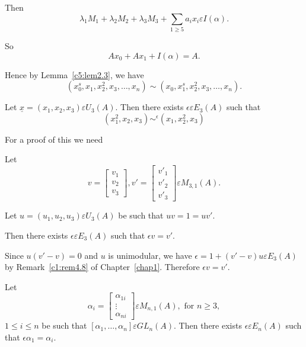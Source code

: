 \begin{Proof}
Then
$$
\lambda_1 M_1+\lambda_2 M_2+\lambda_3 M_3+\sum\limits_{1\geq 5}
a_ix_i\varepsilon I(\alpha).
$$

So
$$
Ax_0+Ax_1+I(\alpha)=A.
$$

Hence by Lemma~\ref{c5:lem2.3}, we have
$$
\left(x^{s}_0,x_1,x^{2}_2,x_3,\ldots,x_n\right)\sim\left(x_0,x^{s}_1,x^{2}_2,x_3,\ldots,x_n\right).
$$
\enprf
\end{Proof}

\begin{lem}\label{c5:lem2.6}
Let $\underline{x}=(x_1,x_2,x_3)\varepsilon U_3(A)$. Then there exists
$\epsilon \varepsilon E_3(A)$ such that 
$$
\left(x^{2}_1,x_2,x_3\right)\displaystyle\mathop{\sim}^{\epsilon}\left(x_1,x^{2}_2,x_3\right)
$$
\end{lem}

For a proof of this we need

\begin{lem}\label{c5:lem2.7}
Let 
$$
v=
\begin{bmatrix}
v_1\\
v_2\\
v_3
\end{bmatrix}, v'=\begin{bmatrix}
v'_1\\
v'_2\\
v'_3
\end{bmatrix} \varepsilon M_{3,1}(A).
$$

Let $u=(u_1,u_2,u_3)\varepsilon U_3(A)$ be such that $uv=1=uv'$. 

Then there exists $\epsilon \varepsilon E_3(A)$ such that $\epsilon
v=v'$. 
\end{lem}

\begin{Proof}
Since $u(v'-v)=0$ and $u$ is unimodular, we have
$\epsilon=1+(v'-v)u\varepsilon E_3(A)$ by Remark~\ref{c1:rem4.8} of
Chapter~\ref{chap1}. Therefore $\epsilon v=v'$. 
\enprf
\end{Proof}

\begin{lem}\label{c5:lem2.8}
Let 
$$
\alpha_i=
\begin{bmatrix}
\alpha_{1i}\\
\vdots\\
\alpha_{ni}
\end{bmatrix} \varepsilon M_{n,1}(A),\text{ for } n \geq 3,
$$
$1\leq i \leq n$ be such that $[\alpha_1,\ldots,\alpha_n]\varepsilon
GL_n(A)$. Then there exists $\epsilon \varepsilon E_n(A)$ such that
$\epsilon \alpha_1=\alpha_i$. 
\end{lem}

